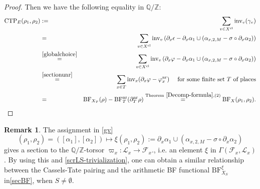 \documentclass[a4paper]{amsart}
\theoremstyle{definition}
\newtheorem{rmk}[thm]{Remark}
\numberwithin{equation}{section}
\begin{document}
\begin{proof}
Then we have the following equality in $\mathbb{Q}/\mathbb{Z}$:
\begin{eqnarray*}
    \mathrm{CTP}_E(\rho_1, \rho_2) &:=& \sum_{v \in X^{\mathrm{cl}}} \mathrm{inv}_v (\gamma_v)\\
   &=& \sum_{v \in X^{\mathrm{cl}}} \mathrm{inv}_v \left(\partial_x\epsilon- \partial_x\alpha_{1} \cup( \alpha_{x,2,M}-\sigma \circ \partial_x\alpha_{2} ) \right)\\
   &\stackrel{\eqref{globalchoice}}{=}& \sum_{v \in X^{\mathrm{cl}}} \mathrm{inv}_v \left(\partial_x\varphi- \partial_x\alpha_{1}\cup ( \alpha_{x,2,M} -\sigma \circ \partial_x\alpha_{2} )\right)\\
   &\stackrel{\eqref{sectionunr}}{=}&\sum_{x\in T}\mathrm{inv}_x(\partial_x\varphi-\varphi_x^{\mathrm{nr}})\quad \text{ for some finite set $T$ of places}\\
   &=&\mathrm{BF}_{X_T}(\rho)-\mathrm{BF}_T^\mathrm{nr}(\partial^\mathrm{nr}_T\rho)\rlap{\ }
   \stackrel{\mathrm{Theorem}\ \ref{Decomp-formula}, (2)}{=} \mathrm{BF}_X(\rho_1, \rho_2).
\end{eqnarray*}
\end{proof}

\begin{rmk}
The assignment in \eqref{gv}
    $$(\rho_1,\rho_2)=([\alpha_1], [\alpha_2]) \mapsto \xi(\rho_1,\rho_2):= \partial_x\alpha_{1} \cup ( \alpha_{x,2,M}-\sigma \circ \partial_x\alpha_{2} )  $$
    gives a section to the $\mathbb{Q}/\mathbb{Z}$-torsor $\varpi_x:\mathscr{L}_x \to \mathscr{F}_x.$, i.e. an element $\xi$ in $\Gamma(\mathscr{F}_x, \mathscr{L}_x)$. By using this and \eqref{scrLS-trivialization}, one can obtain a similar relationship between the Cassels-Tate pairing and the arithmetic BF functional $\mathrm{BF}_{X_S}^{\xi}$ in\eqref{secBF}, when $S \neq \emptyset$.
\end{rmk}
\end{document}
